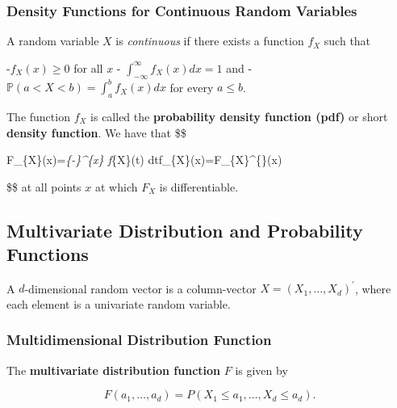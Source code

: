 \documentclass[
  letterpaper,
  DIV=11,
  numbers=noendperiod]{scrreprt}
\theoremstyle{definition}
\theoremstyle{plain}
\theoremstyle{plain}
\theoremstyle{remark}
\begin{document}
\bigskip

\hypertarget{density-functions-for-continuous-random-variables}{%
\subsubsection{Density Functions for Continuous Random
Variables}\label{density-functions-for-continuous-random-variables}}

A random variable \(X\) is \textit{continuous} if there exists a
function \(f_{X}\) such that

-\(f_{X}(x)\geq 0\) for all \(x\) -
\(\int_{-\infty}^{\infty}f_{X}(x)dx=1\) and -
\(\mathbb{P}(a<X<b)=\int_{a}^{b} f_{X}(x) dx\) for every \(a\leq b\).

The function \(f_{X}\) is called the \textbf{probability density
function (pdf)} or short \textbf{density function}. We have that \$\$

F\_\{X\}(x)=\int\emph{\{-\infty\}\^{}\{x\} f}\{X\}(t)
dt\quad{}\quad f\_\{X\}(x)=F\_\{X\}\^{}\{\prime\}(x)

\$\$ at all points \(x\) at which \(F_{X}\) is differentiable.

\hypertarget{multivariate-distribution-and-probability-functions}{%
\subsection{Multivariate Distribution and Probability
Functions}\label{multivariate-distribution-and-probability-functions}}

A \(d\)-dimensional random vector is a column-vector
\(X=(X_1,\dots,X_d)^\prime\), where each element is a univariate random
variable.

\hypertarget{multidimensional-distribution-function}{%
\subsubsection{Multidimensional Distribution
Function}\label{multidimensional-distribution-function}}

The \textbf{multivariate distribution function} \(F\) is given by

\[F(a_1,\dots,a_d)=P(X_1\le a_1,\dots,X_d\le a_d).\]
\end{document}
